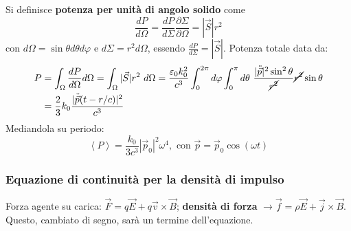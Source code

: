 \documentclass[10pt, a4paper]{scrartcl}
\numberwithin{equation}{subsection}
\theoremstyle{style1}
\begin{document}
Si definisce \textbf{potenza per unit\`a di angolo solido} come
\begin{equation}
	\frac{d P}{d \Omega } = \frac{d P}{d \Sigma} \frac{\partial \Sigma}{\partial \Omega } = |\vec{S} |r^2
\end{equation}
con $d\Omega = \sin \theta  d\theta  d\varphi $ e $d\Sigma = r^2 d\Omega $, essendo $\frac{d P}{d \Sigma} = |\vec{S}| $. Potenza totale data da:
\begin{equation}
	\begin{split}
		P &= \int_{\Omega } \frac{d P}{d \Omega } d\Omega = \int_{\Omega } |\vec{S}| r^2 \ d\Omega = \frac{\varepsilon _0 k_0^2}{c^3} \int_{0} ^{2\pi} d\varphi \int_{0} ^\pi d\theta \ \frac{|\ddot{\vec{p}}|^2 \sin ^2 \theta }{\cancel{r^2}} \cancel{r^2} \sin \theta  \\
		  &= \frac{2}{3} k_0 \frac{|\ddot{\vec{p}}(t- r / c)|^2}{c^3}
	\end{split}
\end{equation}
 Mediandola su periodo:
 \begin{equation}
 	\left\langle P \right\rangle= \frac{k_0}{3c^3} \left\lvert \vec{p}_0 \right\rvert ^2 \omega^4, \text{ con } \vec{p}=\vec{p}_0 \cos(\omega t)
 \end{equation}
\subsubsection{Equazione di continuit\`a per la densit\`a di impulso}

Forza agente su carica: $\vec{F}=q\vec{E}+q\vec{v}\times \vec{B}$; \textbf{densit\`a di forza} $\to \vec{f}=\rho \vec{E}+\vec{j}\times \vec{B}$. Questo, cambiato di segno, sar\`a un termine dell'equazione.
\end{document}
